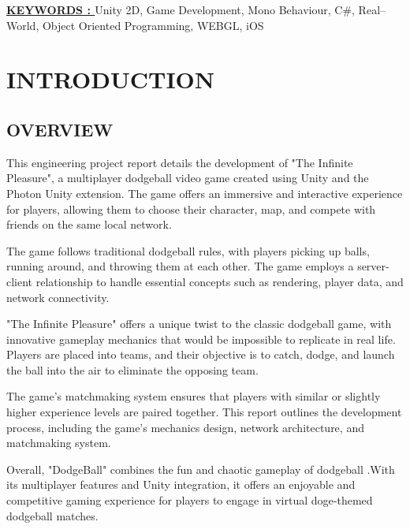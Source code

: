 \documentclass[12pt]{report}
\begin{document}
\raggedright{ \textbf \underline{KEYWORDS : }}Unity 2D, Game Development, Mono Behaviour, C\#, Real–World, Object Oriented Programming, WEBGL, iOS

\clearpage



\tableofcontents
\clearpage

\listoffigures
\clearpage
{}
\fancyhead[R]{\thepage}

\centering
\section{INTRODUCTION}
\raggedright
\subsection{OVERVIEW}
\justifying
\setlength{\parindent}{3.7em}
\setlength{\parskip}{0.5em}
\renewcommand{\baselinestretch}{1.5}
\normalsize
\hspace{1cm}
This engineering project report details the development of "The Infinite Pleasure", a multiplayer dodgeball video game created using Unity and the Photon Unity extension. The game offers an immersive and interactive experience for players, allowing them to choose their character, map, and compete with friends on the same local network.

The game follows traditional dodgeball rules, with players picking up balls, running around, and throwing them at each other. The game employs a server-client relationship to handle essential concepts such as rendering, player data, and network connectivity.

"The Infinite Pleasure" offers a unique twist to the classic dodgeball game, with innovative gameplay mechanics that would be impossible to replicate in real life. Players are placed into teams, and their objective is to catch, dodge, and launch the ball into the air to eliminate the opposing team.

The game's matchmaking system ensures that players with similar or slightly higher experience levels are paired together. This report outlines the development process, including the game's mechanics design, network architecture, and matchmaking system.

Overall, "DodgeBall" combines the fun and chaotic gameplay of dodgeball .With its multiplayer features and Unity integration, it offers an enjoyable and competitive gaming experience for players to engage in virtual doge-themed dodgeball matches.
\clearpage
\end{document}
